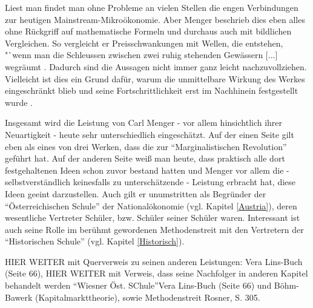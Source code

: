 Liest man \textcite{Menger1871} findet man ohne Probleme an vielen Stellen die engen Verbindungen zur heutigen Mainstream-Mikroökonomie. Aber Menger beschrieb dies eben alles ohne Rückgriff auf mathematische Formeln und durchaus auch mit bildlichen Vergleichen. So vergleicht er Preisschwankungen mit Wellen, die entstehen, "`wenn man die Schleussen zwischen zwei ruhig stehenden Gewässern [...] wegräumt \parencite[S. 172]{Menger1871}. Dadurch sind die Aussagen nicht immer ganz leicht nachzuvollziehen. Vielleicht ist dies ein Grund dafür, warum die unmittelbare Wirkung des Werkes eingeschränkt blieb und seine Fortschrittlichkeit erst im Nachhinein festgestellt wurde \parencite[S. 304]{Rosner2012}. 

Insgesamt wird die Leistung von Carl Menger - vor allem hinsichtlich ihrer Neuartigkeit - heute sehr unterschiedlich eingeschätzt. Auf der einen Seite gilt \textcite{Menger1871} eben als eines von drei Werken, dass die zur "`Marginalistischen Revolution"' geführt hat. Auf der anderen Seite weiß man heute, dass praktisch alle dort festgehaltenen Ideen schon zuvor bestand hatten und Menger vor allem die - selbstverständlich keinesfalls zu unterschätzende - Leistung erbracht hat, diese Ideen geeint darzustellen. Auch gilt er unumstritten als Begründer der "`Österreichischen Schule"' der Nationalökonomie (vgl. Kapitel \ref{Austria}), deren wesentliche Vertreter Schüler, bzw. Schüler seiner Schüler waren. Interessant ist auch seine Rolle im berühmt gewordenen Methodenstreit mit den Vertretern der "`Historischen Schule"' (vgl. Kapitel \ref{Historisch}). 

HIER WEITER mit Querverweis zu seinen anderen Leistungen: Vera Lins-Buch (Seite 66),
HIER WEITER mit Verweis, dass seine Nachfolger in anderen Kapitel behandelt werden "`Wiesner Öst. SChule"'Vera Lins-Buch (Seite 66) und Böhm-Bawerk (Kapitalmarkttheorie), sowie Methodenstreit Rosner, S. 305.


